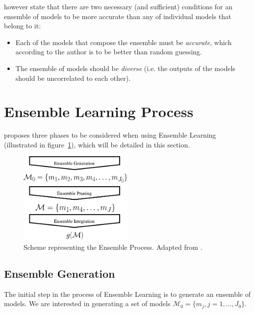 \textcite{hansen1990neural} however state that there are two necessary (and sufficient) conditions for an ensemble of models to be more accurate than any of individual models that belong to it:

\begin{itemize}
	\item Each of the models that compose the ensemble must be \textit{accurate}, which according to the author is to be better than random guessing.
	
	\item The ensemble of models should be \textit{diverse} (i.e. the outputs of the models should be uncorrelated to each other).
\end{itemize}

\section{Ensemble Learning Process}

\textcite{Mendes-Moreira2012} proposes three phases to be considered when using Ensemble Learning (illustrated in figure~\ref{fig:ensemble_process}), which will be detailed in this section. 

\begin{figure}[ht!]
	\centering
	\includegraphics[width=0.5\textwidth]{figures/Ensemble_Process.pdf}
	\caption{Scheme representing the Ensemble Process. Adapted from \cite{Mendes-Moreira2012}.}
	\label{fig:ensemble_process}
\end{figure}

\subsection{Ensemble Generation}\label{sec:ens_gen}

The initial step in the process of Ensemble Learning is to generate an ensemble of models. We are interested in generating a set of models $\mathcal{M}_0 = \{ m_j, j = 1, \dots, J_0 \}$.

